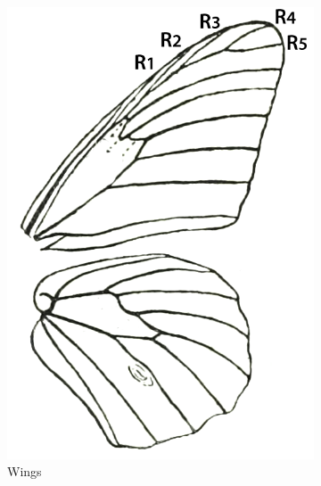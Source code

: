 \documentclass[letterpaper, 11pt]{article}
\begin{document}
\begin{figure}[ht!]
    \centering
    \begin{subfigure}[ht!]{0.25\textwidth}
        \includegraphics[width=\textwidth]{NymphalidWings}
        \caption{Wings \citep[][Fig. 78]{bhl162310}}
        \label{fig:nymphalid1}
    \end{subfigure}
    \hfill %
    \begin{subfigure}[ht!]{0.30\textwidth}

\end{subfigure}
\end{figure}
\end{document}
